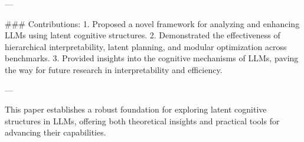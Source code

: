 ---

### Contributions:
1. Proposed a novel framework for analyzing and enhancing LLMs using latent cognitive structures.
2. Demonstrated the effectiveness of hierarchical interpretability, latent planning, and modular optimization across benchmarks.
3. Provided insights into the cognitive mechanisms of LLMs, paving the way for future research in interpretability and efficiency.

--- 

This paper establishes a robust foundation for exploring latent cognitive structures in LLMs, offering both theoretical insights and practical tools for advancing their capabilities.